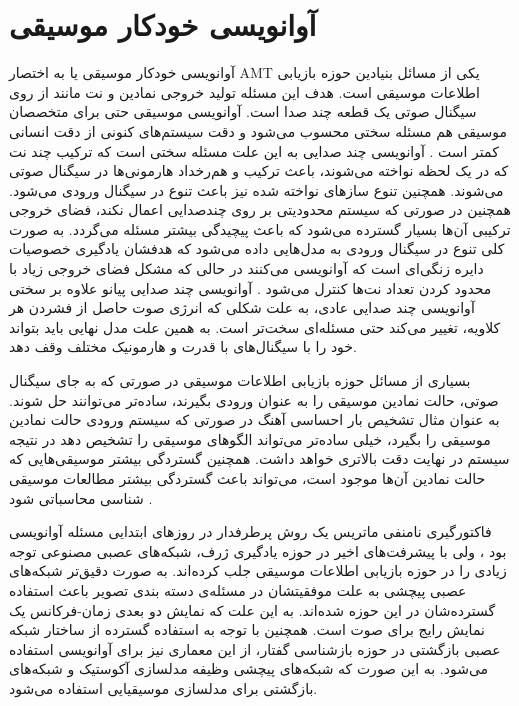 \section{آوانویسی خودکار موسیقی}
آوانویسی خودکار موسیقی
یا به اختصار
AMT
یکی از مسائل بنیادین حوزه بازیابی اطلاعات موسیقی است. هدف این مسئله تولید
خروجی نمادین و نت مانند از روی سیگنال صوتی یک قطعه چند صدا است. آوانویسی
موسیقی حتی برای متخصصان موسیقی هم مسئله سختی محسوب می‌شود و دقت سیستم‌های
کنونی از دقت انسانی کمتر است 
\cite{klapuri2007signal}.
آوانویسی چند صدایی به این علت مسئله سختی است که ترکیب چند نت که در یک لحظه
نواخته می‌شوند، باعث ترکیب و هم‌رخداد هارمونی‌ها در سیگنال صوتی می‌شوند.
همچنین تنوع سازهای نواخته شده نیز باعث تنوع در سیگنال ورودی می‌شود. همچنین
در صورتی که سیستم محدودیتی بر روی چندصدایی اعمال نکند، فضای خروجی ترکیبی آن‌ها
بسیار گسترده می‌شود که باعث پیچیدگی بیشتر مسئله می‌گردد. به صورت کلی تنوع در
سیگنال ورودی به مدل‌هایی داده می‌شود که هدفشان یادگیری خصوصیات دایره زنگی‌ای
است که آوانویسی می‌کنند
\cite{berg2014unsupervised,benetos2012shift}
در حالی که مشکل فضای خروجی زیاد با محدود کردن تعداد نت‌ها کنترل می‌شود
\cite{klapuri2003multiple,emiya2008automatic}.
آوانویسی چند صدایی پیانو علاوه بر سختی آوانویسی چند صدایی عادی، به علت شکلی که
انرژی صوت حاصل از فشردن هر کلاویه، تغییر می‌کند حتی مسئله‌ای سخت‌تر است. به
همین علت مدل نهایی باید بتواند خود را با سیگنال‌های با قدرت و هارمونیک مختلف
وقف دهد.

بسیاری از مسائل حوزه بازیابی اطلاعات موسیقی در صورتی که به جای سیگنال صوتی،
حالت نمادین موسیقی را به عنوان ورودی بگیرند، ساده‌تر می‌توانند حل شوند. به
عنوان مثال تشخیص بار احساسی آهنگ در صورتی که سیستم ورودی حالت نمادین موسیقی
را بگیرد، خیلی ساده‌تر می‌تواند الگوهای موسیقی را تشخیص دهد در نتیجه سیستم در
نهایت دقت بالاتری خواهد داشت. همچنین گستردگی بیشتر موسیقی‌هایی که حالت نمادین
آن‌ها موجود است، می‌تواند باعث گستردگی بیشتر مطالعات موسیقی شناسی محاسباتی%
شود
\cite{cuthbert2010music21}.

فاکتورگیری نامنفی ماتریس یک روش پرطرفدار در روزهای ابتدایی مسئله آوانویسی بود
\cite{smaragdis2003non}،
ولی با پیشرفت‌های اخیر در حوزه یادگیری ژرف،‌ شبکه‌های عصبی مصنوعی توجه زیادی
را در حوزه بازیابی اطلاعات موسیقی جلب کرده‌اند. به صورت دقیق‌تر
شبکه‌های عصبی پیچشی به علت موفقیتشان در مسئله‌ی دسته بندی تصویر باعث استفاده
گسترده‌شان در این حوزه شده‌اند. به این علت که نمایش دو بعدی زمان-فرکانس یک
نمایش رایج برای صوت است. همچنین با توجه به استفاده گسترده از ساختار شبکه
عصبی بازگشتی در حوزه بازشناسی گفتار، از این معماری نیز برای آوانویسی استفاده
می‌شود. به این صورت که شبکه‌های پیچشی وظیفه مدلسازی آکوستیک و شبکه‌های بازگشتی
برای مدلسازی موسیقیایی استفاده می‌شود.

